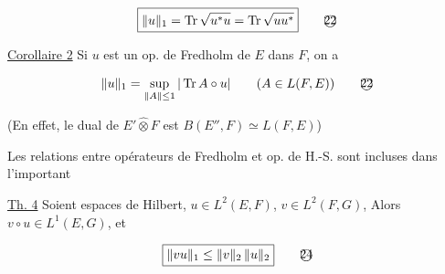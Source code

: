 \[
\boxed{\|u\|_1=\operatorname{Tr}\sqrt{u^*u}=\operatorname{Tr}\sqrt{uu^*}} \tag*{\textcircled{22}}
\]

\uline{Corollaire 2} Si $u$ est un op. de Fredholm de $E$ dans $F$,
on a

\[
\|u\|_1=\sup_{\|A\|\leq1}|\operatorname{Tr} A\circ u|\qquad(A\in L(F,E)) \tag*{\textcircled{22}}
\]

(En effet, le dual de $E'$$\widehat\otimes F$ est $B(E'',F)\simeq L(F,E)$) 


 Les relations entre opérateurs de Fredholm et op.
de H.-S. sont incluses dans l'important

\uline{Th. 4} Soient   espaces de Hilbert, $u\in L^2(E,F)$, $v\in L^2(F,G)$,
Alors $v\circ u\in L^1(E,G)$, et 

\[
\boxed{\|vu\|_1\leq\|v\|_2\,\|u\|_2} \tag*{\textcircled{24}}
\]


